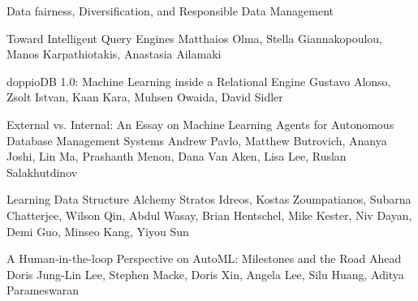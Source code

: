 \documentclass[11pt]{article}
\begin{document}
\begin{bulletin}
\begin{articlesection}{Data fairness, Diversification, and Responsible Data Management}
%
%
%
\begin{article}
{Toward Intelligent Query Engines}
{Matthaios Olma,  Stella Giannakopoulou,  Manos Karpathiotakis, Anastasia Ailamaki}
\graphicspath{{submissions/adaptivedb/}}

\end{article}


\begin{article}
{doppioDB 1.0: Machine Learning inside a Relational Engine}
{Gustavo Alonso, Zsolt Istvan, Kaan Kara, Muhsen Owaida, David Sidler}
\graphicspath{{submissions/gustavo/}}

\end{article}


\begin{article}
{External vs. Internal: An Essay on  Machine Learning Agents for  Autonomous Database Management Systems}
{Andrew Pavlo, Matthew Butrovich, Ananya Joshi, Lin Ma, Prashanth 
Menon, Dana Van Aken, Lisa Lee, Ruslan Salakhutdinov}
\graphicspath{{submissions/selfdriving/}}

\end{article}



\begin{article}
{Learning Data Structure Alchemy}
{Stratos Idreos, 
Kostas Zoumpatianos, 
Subarna Chatterjee, 
Wilson Qin,
Abdul Wasay,
Brian Hentschel, 
Mike Kester,
Niv Dayan,
Demi Guo,
Minseo Kang,
Yiyou Sun
}
\graphicspath{{submissions/Learning/}}

\end{article}



\begin{article}
{A Human-in-the-loop Perspective on AutoML: Milestones and the Road Ahead}
{Doris Jung-Lin Lee, Stephen Macke, Doris Xin, Angela Lee, Silu Huang, Aditya Parameswaran}
\graphicspath{{submissions/automl/}}

\end{article}


\end{articlesection}
\end{bulletin}
\end{document}
